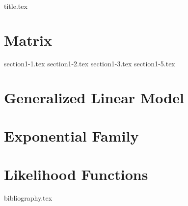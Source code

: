 \documentclass[a4paper,11pt]{book}
\theoremstyle{definition}
\theoremstyle{remark}
\begin{document}
\frontmatter
{title.tex}
\clearpage

\tableofcontents

\mainmatter

\chapter{Matrix}
{section1-1.tex}
{section1-2.tex}
{section1-3.tex}
{section1-5.tex}

\chapter{Generalized Linear Model}




\chapter{Exponential Family}




\chapter{Likelihood Functions}








\backmatter

{bibliography.tex}
\end{document}
